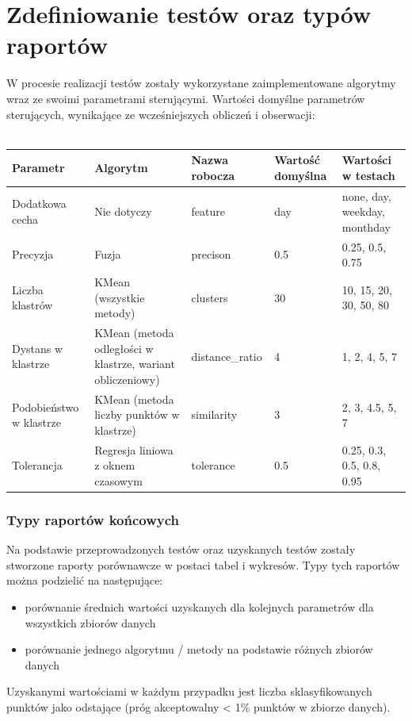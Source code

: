 \documentclass[eng,printmode]{mgr}
\begin{document}
\section{Zdefiniowanie testów oraz typów raportów}
W procesie realizacji testów zostały wykorzystane zaimplementowane algorytmy wraz ze swoimi parametrami sterującymi. Wartości domyślne parametrów sterujących, wynikające ze wcześniejszych obliczeń i obserwacji:
\\\\
\begingroup
\fontsize{10pt}{12pt}\selectfont
\begin{tabu} to 0.9\textwidth { | X[l] | X[l] | X[l] | X[l] | X[l] |}
\hline
\textbf{Parametr} & \textbf{Algorytm} & \textbf{Nazwa robocza} & \textbf{Wartość domyślna} & \textbf{Wartości w testach}\\
\hline
Dodatkowa cecha & Nie dotyczy & feature & day & none, day, weekday, monthday \\
\hline
Precyzja & Fuzja & precison &  0.5 & 0.25, 0.5, 0.75 \\
\hline
Liczba klastrów & KMean (wszystkie metody) & clusters & 30 & 10, 15, 20, 30, 50, 80\\
\hline
Dystans w klastrze & KMean (metoda odległości w klastrze, wariant obliczeniowy) & distance\_ratio & 4 & 1, 2, 4, 5, 7\\
\hline
Podobieństwo w klastrze & KMean (metoda liczby punktów w klastrze) & similarity & 3 & 2, 3, 4.5, 5, 7\\
\hline
Tolerancja & Regresja liniowa z oknem czasowym & tolerance & 0.5 & 0.25, 0.3, 0.5, 0.8, 0.95\\
\hline
\end{tabu}
\endgroup

\subsubsection{Typy raportów końcowych}
Na podstawie przeprowadzonych testów oraz uzyskanych testów zostały stworzone raporty porównawcze w postaci tabel i wykresów. Typy tych raportów można podzielić na następujące:
\begin{itemize}
  \item porównanie średnich wartości uzyskanych dla kolejnych parametrów dla wszystkich zbiorów danych
  \item porównanie jednego algorytmu / metody na podstawie różnych zbiorów danych
\end{itemize}

Uzyskanymi wartościami w każdym przypadku jest liczba sklasyfikowanych punktów jako odstające (próg akceptowalny < 1\% punktów w zbiorze danych).
\end{document}
